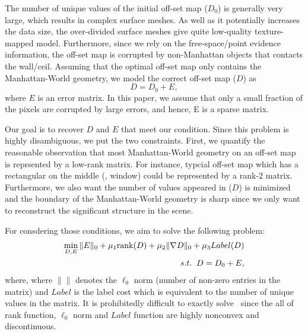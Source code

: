 The number of unique values of the initial off-set map ($D_0$) is generally very large, which results in complex surface meshes.  As well as it potentially increases the data size, the over-divided surface meshes give quite low-quality texture-mapped model. Furthermore, since we rely on the free-space/point evidence information, the off-set map is corrupted by non-Manhattan objects that contacts the wall/ceil. Assuming that the optimal off-set map only contains the Manhattan-World geometry, we model the correct off-set map ($D$) as
\begin{equation}
D = D_0 + E, \label{formulation}
\end{equation}
where $E$ is an error matrix. In this paper, we assume that only a small fraction of the pixels are corrupted by large errors, and hence, E is a sparse matrix.

Our goal is to recover $D$ and $E$ that meet our condition. Since this problem is highly disambiguous, we put the two constraints. First, we quantify the reasonable observation that most Manhattan-World geometry on an off-set map is reprsented by a low-rank matrix. For instance, typcial off-set map which has a rectangular on the middle (\ie, window) could be represented by a rank-$2$ matrix. Furthermore, we also want the number of values appeared in ($D$) is minimized and the boundary of the Manhattan-World geometry is sharp since we only want to reconstruct the significant structure in the scene.

For consdering those conditions, we aim to solve the following problem:
\begin{align}
\min_{D, E}{\|E\|_0 +\mu_1{\rm rank}(D) + \mu_2 \|\nabla D\|_0 + \mu_3 Label(D) }\nonumber \\
s.t.\;\;D = D_0 + E,\label{eq:original}
\end{align}
where, where $\|\|$ denotes the $\ell_0$ norm (number of non-zero entries in the matrix) and $Label$ is the label cost which is equivalent to the number of unique values in the matrix. It is prohibitedly difficult to exactly solve~ since the all of rank function, $\ell_0$ norm and $Label$ function are highly nonconvex and discontinuous. 

